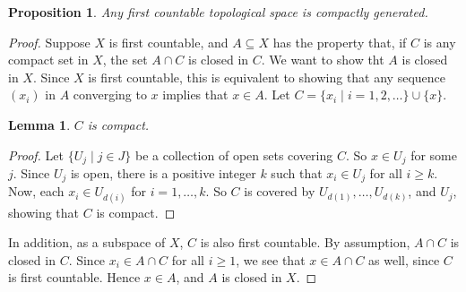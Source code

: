 \documentclass[12pt]{article}
\newtheorem{prop}{Proposition}
\newtheorem{lem}{Lemma}
\begin{document}
\begin{prop} Any first countable topological space is compactly generated. \end{prop}
\begin{proof}  Suppose $X$ is first countable, and $A\subseteq X$ has the property that, if $C$ is any compact set in $X$, the set $A\cap C$ is closed in $C$.  We want to show tht $A$ is closed in $X$.  Since $X$ is first countable, this is equivalent to showing that any sequence $(x_i)$ in $A$ converging to $x$ implies that $x\in A$.  Let $C=\lbrace x_i \mid i=1,2,\ldots\rbrace \cup \lbrace x\rbrace$.  

\begin{lem} $C$ is compact. \end{lem} 
\begin{proof} Let $\lbrace U_j\mid j \in J\rbrace$ be a collection of open sets covering $C$.  So $x\in U_j$ for some $j$.  Since $U_j$ is open, there is a positive integer $k$ such that $x_i\in U_j$ for all $i\ge k$.  Now, each $x_i \in U_{d(i)}$ for $i=1,\ldots, k$.  So $C$ is covered by $U_{d(1)}, \ldots, U_{d(k)}$, and $U_j$, showing that $C$ is compact.  
\end{proof}

In addition, as a subspace of $X$, $C$ is also first countable.  By assumption, $A\cap C$ is closed in $C$.  Since $x_i\in A\cap C$ for all $i\ge 1$, we see that $x\in A\cap C$ as well, since $C$ is first countable.  Hence $x\in A$, and $A$ is closed in $X$.
\end{proof}
\end{document}
